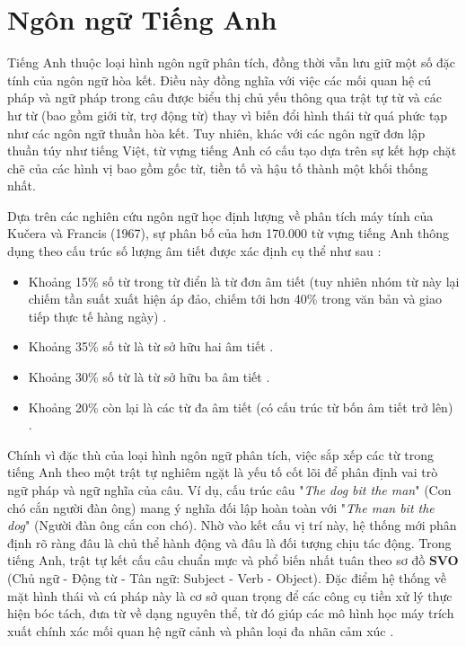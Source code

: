 
\section{Ngôn ngữ Tiếng Anh}

Tiếng Anh thuộc loại hình ngôn ngữ phân tích, đồng thời vẫn lưu giữ một số đặc tính của ngôn ngữ hòa kết. Điều này đồng nghĩa với việc các mối quan hệ cú pháp và ngữ pháp trong câu được biểu thị chủ yếu thông qua trật tự từ và các hư từ (bao gồm giới từ, trợ động từ) thay vì biến đổi hình thái từ quá phức tạp như các ngôn ngữ thuần hòa kết. Tuy nhiên, khác với các ngôn ngữ đơn lập thuần túy như tiếng Việt, từ vựng tiếng Anh có cấu tạo dựa trên sự kết hợp chặt chẽ của các hình vị bao gồm gốc từ, tiền tố và hậu tố thành một khối thống nhất.

Dựa trên các nghiên cứu ngôn ngữ học định lượng về phân tích máy tính của Kučera và Francis (1967), sự phân bố của hơn 170.000 từ vựng tiếng Anh thông dụng theo cấu trúc số lượng âm tiết được xác định cụ thể như sau \cite{kucera1967computational}:
\begin{itemize}
\item Khoảng 15\% số từ trong từ điển là từ đơn âm tiết (tuy nhiên nhóm từ này lại chiếm tần suất xuất hiện áp đảo, chiếm tới hơn 40\% trong văn bản và giao tiếp thực tế hàng ngày) \cite{kucera1967computational}.

\item Khoảng 35\% số từ là từ sở hữu hai âm tiết \cite{kucera1967computational}.

\item Khoảng 30\% số từ là từ sở hữu ba âm tiết \cite{kucera1967computational}.

\item Khoảng 20\% còn lại là các từ đa âm tiết (có cấu trúc từ bốn âm tiết trở lên) \cite{kucera1967computational}.
\end{itemize}

Chính vì đặc thù của loại hình ngôn ngữ phân tích, việc sắp xếp các từ trong tiếng Anh theo một trật tự nghiêm ngặt là yếu tố cốt lõi để phân định vai trò ngữ pháp và ngữ nghĩa của câu. Ví dụ, cấu trúc câu "\textit{The dog bit the man}" (Con chó cắn người đàn ông) mang ý nghĩa đối lập hoàn toàn với "\textit{The man bit the dog}" (Người đàn ông cắn con chó). Nhờ vào kết cấu vị trí này, hệ thống mới phân định rõ ràng đâu là chủ thể hành động và đâu là đối tượng chịu tác động. Trong tiếng Anh, trật tự kết cấu câu chuẩn mực và phổ biến nhất tuân theo sơ đồ \textbf{SVO} (Chủ ngữ - Động từ - Tân ngữ: Subject - Verb - Object). Đặc điểm hệ thống về mặt hình thái và cú pháp này là cơ sở quan trọng để các công cụ tiền xử lý thực hiện bóc tách, đưa từ về dạng nguyên thể, từ đó giúp các mô hình học máy trích xuất chính xác mối quan hệ ngữ cảnh và phân loại đa nhãn cảm xúc \cite{singh2018natural}.


